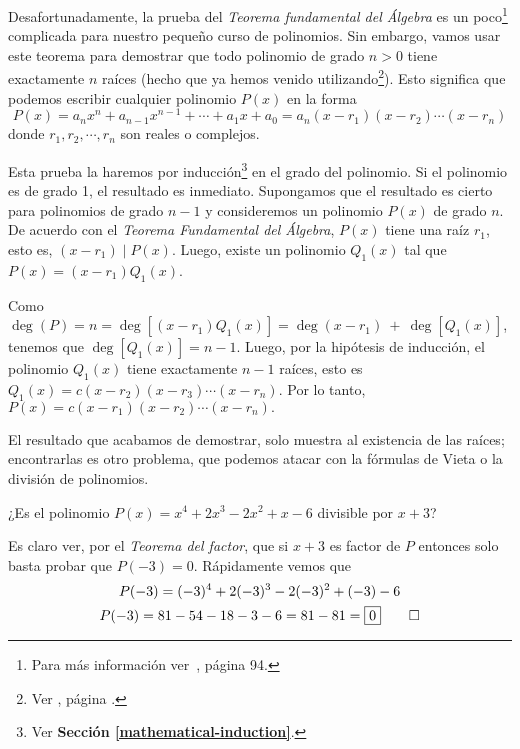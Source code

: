 Desafortunadamente, la prueba del \textit{Teorema fundamental del Álgebra} es un poco\footnote{Para más información ver~\cite{BGR14}, página 94.} complicada para nuestro pequeño curso de polinomios.
Sin embargo, vamos usar este teorema para demostrar que todo polinomio de grado $n > 0$ tiene exactamente $n$ raíces (hecho que ya hemos venido utilizando\footnote{Ver , página \pageref{numbers-of-roots}.}).
Esto significa que podemos escribir cualquier polinomio $P(x)$ en la forma
\[
    P(x) = a_n x^n + a_{n - 1} x^{n - 1} + \cdots  + a_1 x + a_0 = a_n (x - r_1)(x - r_2) \cdots (x - r_n)
\]
donde $r_1, r_2, \cdots, r_n$ son reales o complejos.

Esta prueba la haremos por inducción\footnote{Ver \textbf{Sección \ref{mathematical-induction}}.} en el grado del polinomio.
Si el polinomio es de grado 1, el resultado es inmediato.
Supongamos que el resultado es cierto para polinomios de grado $n - 1$ y consideremos un polinomio $P(x)$ de grado $n$.
De acuerdo con el \textit{Teorema Fundamental del Álgebra}, $P(x)$ tiene una raíz $r_1$, esto es, $(x - r_1) \mid P(x)$.
Luego, existe un polinomio $Q_1 (x)$ tal que $P(x) = (x - r_1)Q_1(x)$.

Como $\deg(P) = n = \deg[(x - r_1)Q_1(x)] = \deg(x - r_1)\ +\ \deg[Q_1(x)]$, tenemos que $\deg[Q_1(x)] = n - 1$.
Luego, por la hipótesis de inducción, el polinomio $Q_1(x)$ tiene exactamente $n - 1$ raíces, esto es $Q_1(x) = c(x - r_2)(x - r_3)\cdots(x - r_n)$.
Por lo tanto, $P(x) = c(x - r_1)(x - r_2)\cdots(x - r_n).$

El resultado que acabamos de demostrar, solo muestra al existencia de las raíces;
encontrarlas es otro problema, que podemos atacar con la fórmulas de Vieta o la división de polinomios.

\begin{section-example.tcb}
    ¿Es el polinomio $P(x) = x^4 + 2x^3 - 2x^2 + x - 6$ divisible por $x + 3$?
\end{section-example.tcb}
\begin{solution}
    Es claro ver, por el \textit{Teorema del factor}, que si $x + 3$ es factor de $P$ entonces solo basta probar que $P(-3) = 0$.
    Rápidamente vemos que
    \begin{gather*}
        P(-3) = (-3)^4 + 2(-3)^3 - 2(-3)^2 + (-3) - 6\\
        P(-3) = 81 - 54 - 18 - 3 - 6 = 81 - 81 = \boxed{0} \qedhere
    \end{gather*}
\end{solution}

